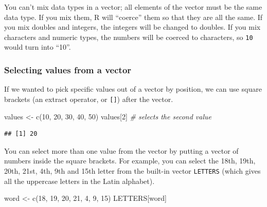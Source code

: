 \documentclass[
  oneside]{book}
\newenvironment{Shaded}{\begin{snugshade}}{\end{snugshade}}
\newcommand{\CommentTok}[1]{\textcolor[rgb]{0.56,0.35,0.01}{\textit{#1}}}
\newcommand{\DecValTok}[1]{\textcolor[rgb]{0.00,0.00,0.81}{#1}}
\newcommand{\FunctionTok}[1]{\textcolor[rgb]{0.00,0.00,0.00}{#1}}
\newcommand{\NormalTok}[1]{#1}
\newcommand{\OtherTok}[1]{\textcolor[rgb]{0.56,0.35,0.01}{#1}}
\begin{document}
\begin{warning}
You can't mix data types in a vector; all elements of the vector must be the same data type. If you mix them, R will ``coerce'' them so that they are all the same. If you mix doubles and integers, the integers will be changed to doubles. If you mix characters and numeric types, the numbers will be coerced to characters, so \texttt{10} would turn into ``10''.

\end{warning}

\hypertarget{selecting-values-from-a-vector}{%
\subsubsection{Selecting values from a vector}\label{selecting-values-from-a-vector}}

If we wanted to pick specific values out of a vector by position, we can use square brackets (an extract operator, or \texttt{{[}{]}}) after the vector.

\begin{Shaded}
\begin{Highlighting}[]
\NormalTok{values }\OtherTok{\textless{}{-}} \FunctionTok{c}\NormalTok{(}\DecValTok{10}\NormalTok{, }\DecValTok{20}\NormalTok{, }\DecValTok{30}\NormalTok{, }\DecValTok{40}\NormalTok{, }\DecValTok{50}\NormalTok{)}
\NormalTok{values[}\DecValTok{2}\NormalTok{] }\CommentTok{\# selects the second value}
\end{Highlighting}
\end{Shaded}

\begin{verbatim}
## [1] 20
\end{verbatim}

You can select more than one value from the vector by putting a vector of numbers inside the square brackets. For example, you can select the 18th, 19th, 20th, 21st, 4th, 9th and 15th letter from the built-in vector \texttt{LETTERS} (which gives all the uppercase letters in the Latin alphabet).

\begin{Shaded}
\begin{Highlighting}[]
\NormalTok{word }\OtherTok{\textless{}{-}} \FunctionTok{c}\NormalTok{(}\DecValTok{18}\NormalTok{, }\DecValTok{19}\NormalTok{, }\DecValTok{20}\NormalTok{, }\DecValTok{21}\NormalTok{, }\DecValTok{4}\NormalTok{, }\DecValTok{9}\NormalTok{, }\DecValTok{15}\NormalTok{)}
\NormalTok{LETTERS[word]}
\end{Highlighting}
\end{Shaded}
\end{document}
